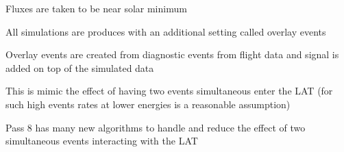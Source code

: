 \documentclass{article}
\begin{document}
\begin{myEnumerate}
\begin{myEnumerate}
\begin{myEnumerate}
					\item Fluxes are taken to be near solar minimum
				\end{myEnumerate}
				\item All simulations are produces with an additional setting called overlay events
				\begin{myEnumerate}
					\item Overlay events are created from diagnostic events from flight data and signal is added on top of the simulated data
					\item This is mimic the effect of having two events simultaneous enter the LAT (for such high events rates at lower energies is a reasonable assumption)
					\item Pass 8 has many new algorithms to handle and reduce the effect of two simultaneous events interacting with the LAT
				\end{myEnumerate}


\end{myEnumerate}
\end{myEnumerate}
\end{document}
